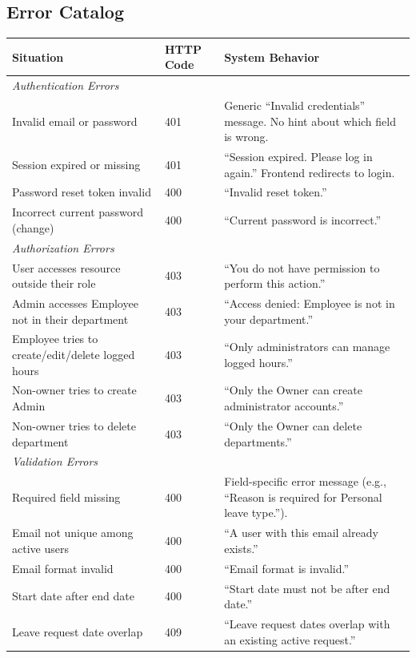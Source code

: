 \documentclass[11pt,a4paper]{article}
\begin{document}
\subsection{Error Catalog}

\begin{longtable}{p{5.5cm} p{2cm} p{6cm}}
\toprule
\textbf{Situation} & \textbf{HTTP Code} & \textbf{System Behavior} \\
\midrule
\multicolumn{3}{l}{\textit{Authentication Errors}} \\
\midrule
Invalid email or password & 401 & Generic ``Invalid credentials'' message. No hint about which field is wrong. \\
Session expired or missing & 401 & ``Session expired. Please log in again.'' Frontend redirects to login. \\
Password reset token invalid & 400 & ``Invalid reset token.'' \\
Incorrect current password (change) & 400 & ``Current password is incorrect.'' \\
\midrule
\multicolumn{3}{l}{\textit{Authorization Errors}} \\
\midrule
User accesses resource outside their role & 403 & ``You do not have permission to perform this action.'' \\
Admin accesses Employee not in their department & 403 & ``Access denied: Employee is not in your department.'' \\
Employee tries to create/edit/delete logged hours & 403 & ``Only administrators can manage logged hours.'' \\
Non-owner tries to create Admin & 403 & ``Only the Owner can create administrator accounts.'' \\
Non-owner tries to delete department & 403 & ``Only the Owner can delete departments.'' \\
\midrule
\multicolumn{3}{l}{\textit{Validation Errors}} \\
\midrule
Required field missing & 400 & Field-specific error message (e.g., ``Reason is required for Personal leave type.''). \\
Email not unique among active users & 400 & ``A user with this email already exists.'' \\
Email format invalid & 400 & ``Email format is invalid.'' \\
Start date after end date & 400 & ``Start date must not be after end date.'' \\
Leave request date overlap & 409 & ``Leave request dates overlap with an existing active request.'' \\

\end{longtable}
\end{document}
